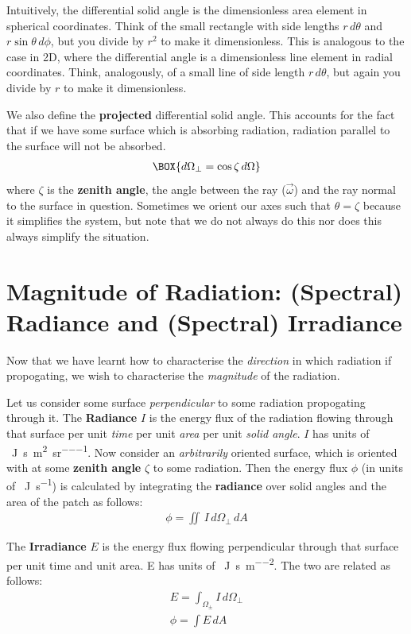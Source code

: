 Intuitively, the differential solid angle is the dimensionless area element in spherical coordinates. Think of the small rectangle with side lengths $r\,d\theta$ and $r\sin\theta \,d\phi$, but you divide by $r^2$ to make it dimensionless. This is analogous to the case in 2D, where the differential angle is a dimensionless line element in radial coordinates. Think, analogously, of a small line of side length $r\,d\theta$, but again you divide by $r$ to make it dimensionless.

We also define the \textbf{projected} differential solid angle. This accounts for the fact that if we have some surface which is absorbing radiation, radiation parallel to the surface will not be absorbed.
\begin{align}
    \BOX{d\Omega_\perp=\cos\zeta\,d\Omega}
\end{align}
where $\zeta$ is the \textbf{zenith angle}, the angle between the ray ($\vec{\omega}$) and the ray normal to the surface in question. Sometimes we orient our axes such that $\theta=\zeta$ because it simplifies the system, but note that we do not always do this nor does this always simplify the situation.

\section{Magnitude of Radiation: (Spectral) Radiance and (Spectral) Irradiance}

Now that we have learnt how to characterise the \textit{direction} in which radiation if propogating, we wish to characterise the \textit{magnitude} of the radiation. 

Let us consider some surface \textit{perpendicular} to some radiation propogating through it. The \textbf{Radiance} $I$ is the energy flux of the radiation flowing through that surface per unit \textit{time} per unit \textit{area} per unit \textit{solid angle}. $I$ has units of \qty{}{\joule\per\second\per\metre\squared\per\steradian}. Now consider an \textit{arbitrarily} oriented surface, which is oriented with at some \textbf{zenith angle} $\zeta$ to some radiation. Then the energy flux $\phi$ (in units of \qty{}{\joule\per\second}) is calculated by integrating the \textbf{radiance} over solid angles and the area of the patch as follows:
\begin{align}
\phi=\iint\,I\,d\Omega_\perp\,dA
\end{align}

The \textbf{Irradiance} $E$ is the energy flux flowing perpendicular through that surface per unit time and unit area. E has units of \qty{}{\joule\per\second\per\metre\squared}. The two are related as follows:
\begin{gather*}
    E=\int_{\Omega_\pm} I\,d\Omega_\perp \\
    \phi=\int E\,dA
\end{gather*}

